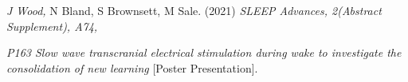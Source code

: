 \item
	\textit{J Wood, }N Bland, S Brownsett, M Sale. (2021) \textit{SLEEP Advances, 2(Abstract Supplement), A74,} \par
	\textit{P163 Slow wave transcranial electrical stimulation during wake to investigate the consolidation of new learning} [Poster Presentation]. 

